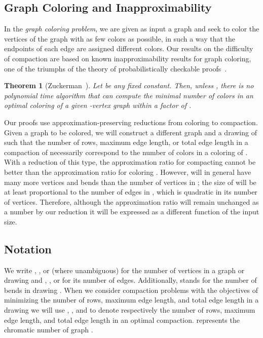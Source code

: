 \documentclass[12pt]{article}
\newtheorem{theorem}{Theorem}
\theoremstyle{definitions}
\begin{document}
\subsection{Graph Coloring and Inapproximability}

In the \emph{graph coloring problem}, we are given as input a graph and seek to color the vertices of the graph with as few colors as possible, in such a way that the endpoints of each edge are assigned different colors. Our results on the difficulty of compaction are based on known inapproximability results for graph coloring, one of the triumphs of the theory of probabilistically checkable proofs~\cite{Zuckerman:2007, Feige-Color, Khot-Color}.

\begin{theorem}[Zuckerman~\cite{Zuckerman:2007}]
\label{lem:chi-rho}
Let  be any fixed constant. Then, unless , there is no
polynomial time algorithm that can compute the minimal number of colors
 in an optimal coloring of a given -vertex graph within a factor of .
\end{theorem}

Our proofs use approximation-preserving reductions from coloring to compaction.
Given a graph  to be colored, we will construct a different graph  and a
drawing  of  such that the number of rows, maximum edge length, or total
edge length in a compaction  of  necessarily correspond to the number of
colors in a coloring of . With a reduction of this type, the approximation
ratio for compacting  cannot be better than the approximation ratio for
coloring . However,  will in general have many more vertices and bends
than the number of vertices in ; the size of  will be at least proportional to the number of edges in , which is quadratic in its number of vertices. Therefore, although the approximation ratio will remain unchanged as a number by our reduction it will be expressed as a different function of the input size.

\subsection{Notation}
We write , , or (where unambiguous)  for the number of vertices in
a graph  or drawing  and , , or  for its number of edges.
Additionally,  stands for the number of bends in drawing . When we consider
compaction problems with the objectives of minimizing the number of rows, maximum edge length, and
total edge length in a drawing  we will use , , and  to denote
respectively the number of rows, maximum edge length, and total edge length 
in an optimal compaction.  represents the chromatic number of graph .
\end{document}
